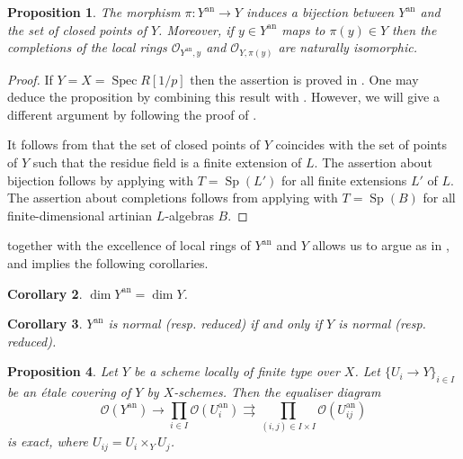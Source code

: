 \documentclass{amsart}
\newtheorem{prop}{Proposition}[section]
\newtheorem{cor}[prop]{Corollary}
\theoremstyle{definition}
\theoremstyle{remark}
\DeclareMathOperator{\Spec}{Spec}
\DeclareMathOperator{\Sp}{Sp}
\newcommand{\OO}{\mathcal O}
\newcommand{\ana}{\mathrm{an}}
\begin{document}
\begin{prop}\label{deJong_like} The morphism $\pi: Y^{\ana}\rightarrow Y$ 
induces a bijection between $Y^{\ana}$ and the set of closed points of $Y$. Moreover, if $y\in Y^{\ana}$ maps to $\pi(y)\in Y$ then 
the completions of the 
local rings $\OO_{Y^{\ana}, y}$ and $\OO_{Y, \pi(y)}$ 
 are naturally isomorphic. 
\end{prop}
\begin{proof} If $Y=X=\Spec R[1/p]$ then the assertion is 
proved in \cite[Lemma 7.1.9]{deJong}. One may deduce the proposition
by combining this result with . However, we will give 
a different argument  by following the proof of \cite[Theorem 2.2.5 4), Example 2.2.11]{conrad_ample}.

It follows from \cite[Lemma 3.17, 3.18(4)]{BIP_new} that the set of  closed points of $Y$ coincides with  the set of points of $Y$ such that the residue field
is a finite extension of $L$. The assertion about bijection follows 
by applying  with  $T=\Sp(L')$ for all finite extensions $L'$ of $L$. The assertion about completions follows from applying 
 with $T=\Sp(B)$ for all finite-dimensional artinian $L$-algebras $B$.
\end{proof}


 together with the excellence
of local rings of $Y^{\ana}$ and $Y$ allows us to argue 
as in \cite[Section 2.1]{Koepf}, \cite[Section 1.2]{conrad} and
implies the following corollaries. 

\begin{cor}\label{dim_rig} $\dim Y^{\ana}=\dim Y$.
\end{cor} 

\begin{cor}\label{normal_rig}  $Y^{\ana}$ is normal (resp. reduced) if and only if 
$Y$ is normal (resp. reduced).
\end{cor} 
\begin{prop}\label{etale_cover} Let $Y$ be a scheme locally of finite type over $X$. Let $\{U_i\rightarrow Y\}_{i\in I}$ be an \'etale covering of $Y$ by $X$-schemes. Then the
equaliser diagram 
\begin{equation}\label{eq0}
\OO(Y^{\ana})\rightarrow \prod_{i\in I} \OO(U_i^{\ana})\rightrightarrows
\prod_{(i,j)\in I\times I} \OO(U_{ij}^{\ana})
\end{equation}
is exact, where $U_{ij}= U_i\times_Y U_j$.
\end{prop}
\end{document}
